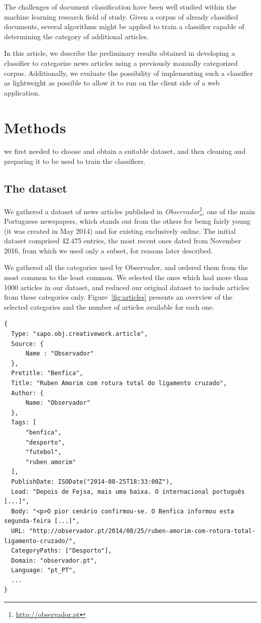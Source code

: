 \documentclass[conference]{IEEEtran}
\begin{document}
The challenges of document classification have been well studied
within the machine learning research field of study. Given a corpus of
already classified documents, several algorithms might be applied to
train a classifier capable of determining the category of additional
articles.

In this article, we describe the preliminary results obtained in
developing a classifier to categorize news articles using a previously
manually categorized corpus. Additionally, we evaluate the possibility
of implementing such a classifier as lightweight as possible to allow
it to run on the client side of a web application.

\section{Methods}
we first needed to choose and obtain a suitable dataset, and then
cleaning and preparing it to be used to train the classifiers.

\subsection{The dataset}
We gathered a dataset of news articles published in
\textit{Observador}\footnote{\url{http://observador.pt}}, one of the
main Portuguese newspapers, which stands out from the others for being
fairly young (it was created in May 2014) and for existing exclusively
online. The initial dataset comprised 42.475 entries, the most recent
ones dated from November 2016, from which we used only a subset, for
reasons later described.

We gathered all the categories used by Observador, and ordered them
from the most common to the least common. We selected the ones which
had more than 1000 articles in our dataset, and reduced our original
dataset to include articles from these categories only.
Figure~\ref{fig:articles} presents an overview of the selected
categories and the number of articles available for each one.

\begin{lstlisting}[float,floatplacement=H,caption={Example of JSON representation of an article},label={lst:article}, extendedchars=true]
{
  Type: "sapo.obj.creativework.article",
  Source: {
      Name : "Observador"
  },
  Pretitle: "Benfica",
  Title: "Ruben Amorim com rotura total do ligamento cruzado",
  Author: {
      Name: "Observador"
  },
  Tags: [
      "benfica",
      "desporto",
      "futebol",
      "ruben amorim"
  ],
  PublishDate: ISODate("2014-08-25T18:33:00Z"),
  Lead: "Depois de Fejsa, mais uma baixa. O internacional português [...]",
  Body: "<p>O pior cenário confirmou-se. O Benfica informou esta segunda-feira [...]",
  URL: "http://observador.pt/2014/08/25/ruben-amorim-com-rotura-total-ligamento-cruzado/",
  CategoryPaths: ["Desporto"],
  Domain: "observador.pt",
  Language: "pt_PT",
  ...
}
\end{lstlisting}
\end{document}
